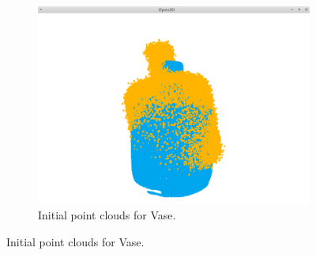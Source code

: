 \documentclass{article}
\begin{document}
\begin{figure}[h!]
\begin{subfigure}[b]{0.3\textwidth}
        \includegraphics[width=\textwidth]{vase1.png}
        \caption{Initial point clouds for Vase.}
    \end{subfigure}


\end{figure}
\end{document}
